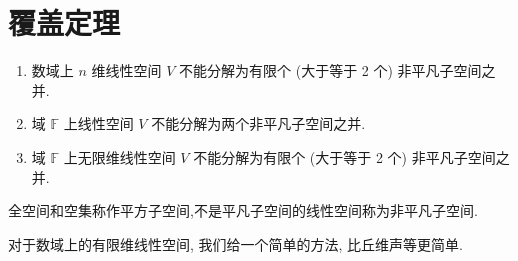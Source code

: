 \documentclass[../../main.tex]{subfiles}%
\begin{document}
\section{覆盖定理}

\begin{theorem}[覆盖定理]\label{theorem:覆盖定理}
\begin{enumerate}
\item 数域上 \( n \) 维线性空间 \( V \) 不能分解为有限个 (大于等于 2 个) 非平凡子空间之并.  

\item 域 \( \mathbb{F} \) 上线性空间 \( V \) 不能分解为两个非平凡子空间之并. 

\item 域 \( \mathbb{F} \) 上无限维线性空间 \( V \) 不能分解为有限个 (大于等于 2 个) 非平凡子空间之并.  
\end{enumerate}
\end{theorem}
\begin{remark}
全空间和空集称作平方子空间,不是平凡子空间的线性空间称为非平凡子空间.
\end{remark}
\begin{note}
对于数域上的有限维线性空间, 我们给一个简单的方法, 比丘维声等更简单.  
\end{note}
\end{document}
